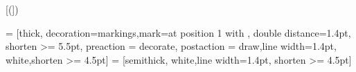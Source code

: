 \newcommand*{\orcid}{}

\graphicspath{{figures/}} %
\setcounter{tocdepth}{\subsubsectiontocdepth}
\newcommand{\ment}{\textit{-ment}}
\newcommand{\ments}{\textit{-ment's}}
\newcommand{\att}[1]{\textsc{#1}}
\newcommand{\type}[1]{\textit{#1}}


\let\HighlightText\textit
\let\ExHighlight\textit

\DeclareCiteCommand{\citetitle}
  {%
   }
  {\ifciteindex
     {}
     {}%
   }
  {\multicitedelim}
  {}
  
\newsavebox\FBox
\def\Boxed#1{\sbox\FBox{\fboxsep=1.5pt
		$\boxed{#1}$}\rule[-1.2\dp\FBox]{0pt}{1.2\ht\FBox}\usebox\FBox}
	

\makeatletter
\DeclareCiteCommand{\citetalias}
{}
{%
	}%
{\multicitedelim}
{}

\DeclareCiteCommand{\citepalias}[\mkbibparens]
{}
{%
	}%
{\multicitedelim}
{}
\makeatother


 = [thick, decoration={markings,mark=at position
                                            1 with {}},
                        double distance=1.4pt, shorten >= 5.5pt,
                        preaction = {decorate},
                        postaction = {draw,line width=1.4pt, white,shorten >= 4.5pt}]
 = [semithick, white,line width=1.4pt, shorten >= 4.5pt]
